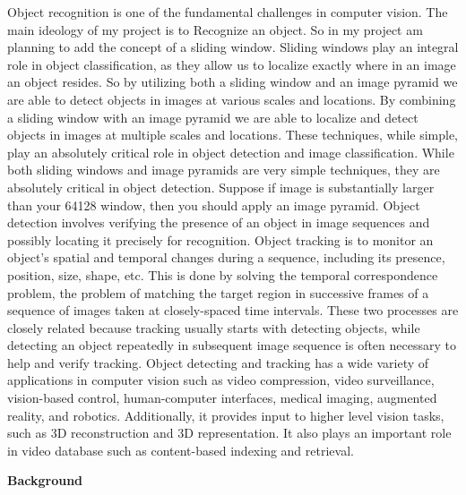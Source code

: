 \documentclass[12pt]{article}
\begin{document}
Object recognition is one of the fundamental challenges in computer vision. The main ideology of my project is to Recognize an object. So in my project am planning to add the concept of a sliding window. Sliding windows play an integral role in object classification, as they allow us to localize exactly where in an image an object resides. So by utilizing both a sliding window and an image pyramid we are able to detect objects in images at various scales and locations. By combining a sliding window with an image pyramid we are able to localize and detect objects in images at multiple scales and locations. These techniques, while simple, play an absolutely critical role in object detection and image classification. While both sliding windows and image pyramids are very simple techniques, they are absolutely critical in object detection. Suppose if image is substantially larger than your 64128 window, then you should
apply an image pyramid. Object detection involves verifying the presence of an object in image sequences and possibly locating it precisely for recognition. Object tracking is to monitor an object's spatial and temporal changes during a sequence, including its presence, position, size, shape, etc. This is done by solving the temporal correspondence problem, the problem of matching the target region in successive frames of a sequence of images taken at closely-spaced time intervals. These two processes are closely related because tracking usually starts with detecting objects, while detecting an object repeatedly in subsequent image sequence is often necessary to help and verify tracking. Object detecting and tracking has a wide variety of applications in computer vision such as video compression, video surveillance, vision-based control, human-computer interfaces, medical imaging, augmented reality, and robotics. Additionally, it provides input to higher level vision tasks, such as 3D reconstruction and 3D representation. It also plays an important role in video database such as content-based indexing and retrieval. 

\textbf{Background}
\end{document}
